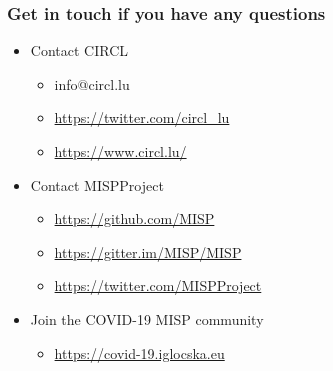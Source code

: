 \begin{frame}
  \frametitle{Get in touch if you have any questions}
  \begin{itemize}
    \item Contact CIRCL
    \begin{itemize}
      \item info@circl.lu
      \item \url{https://twitter.com/circl_lu}
      \item \url{https://www.circl.lu/}
    \end{itemize}
    \item Contact MISPProject 
    \begin{itemize}
      \item \url{https://github.com/MISP}
      \item \url{https://gitter.im/MISP/MISP}
      \item \url{https://twitter.com/MISPProject}
    \end{itemize}
    \item Join the COVID-19 MISP community
    \begin{itemize}
      \item \url{https://covid-19.iglocska.eu}
    \end{itemize}
  \end{itemize}
\end{frame}

